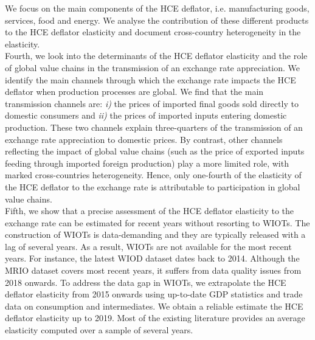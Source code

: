 \documentclass[11pt,a4paper]{paper} %
\begin{document}
We focus on the main components of the HCE deflator, i.e. manufacturing goods, services, food and energy. 
We analyse the contribution of these different products to the HCE deflator elasticity and document cross-country heterogeneity in the elasticity.\\
Fourth, we look into the determinants of the HCE deflator elasticity and the role of global value chains in the transmission of an exchange rate appreciation. 
We identify the main channels through which the exchange rate impacts the HCE deflator when production processes are global.
We find that the main transmission channels are:
\textit{i)} the prices of imported ﬁnal goods sold directly to domestic consumers and
\textit{ii)} the prices of imported inputs entering domestic production. 
These two channels explain three-quarters of the transmission of an exchange rate appreciation to domestic prices.
By contrast, other channels reflecting the impact of global value chains (such as the price of exported inputs feeding through imported foreign production) play a more limited role, with marked cross-countries heterogeneity.
Hence, only one-fourth of the elasticity of the HCE deflator to the exchange rate is attributable to participation in global value chains.\\
Fifth, we show that a precise assessment of the HCE deflator elasticity to the exchange rate can be estimated for recent years without resorting to WIOTs. 
The construction of WIOTs is data-demanding and they are typically released with a lag of several years.
As a result, WIOTs are not available for the most recent years. For instance, the latest WIOD dataset dates back to 2014. 
Although the MRIO dataset covers most recent years, it suffers from data quality issues from 2018 onwards. 
To address the data gap in WIOTs, we extrapolate the HCE deflator elasticity from 2015 onwards using up-to-date GDP statistics and trade data on consumption and intermediates.
We obtain a reliable estimate the HCE deflator elasticity up to 2019.
Most of the existing literature provides an average elasticity computed over a sample of several years. 
\end{document}
